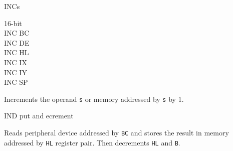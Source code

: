 \begin{basedescript}{
	\desclabelstyle{\multilinelabel}
	\desclabelwidth{3cm}}
\begin{DetailItem}{INC}{s}
\begin{DetailVariants}
			\textnormal{16-bit}\\
			INC BC\\
			INC DE\\
			INC HL\\
			INC IX\\
			INC IY\\
			INC SP
		\end{DetailVariants}

		Increments the operand {\tt s} or memory addressed by {\tt s} by 1.

		\begin{DetailEffects}[v]
			\FlagsINCr[8-bit]
		\end{DetailEffects}

		\begin{DetailEffectsFlags}
		\end{DetailEffectsFlags}

		\begin{DetailTiming}
		\end{DetailTiming}

	\end{DetailItem}

	\pagebreak
	\IntentionallyEmpty
	\pagebreak


	\begin{DetailItem}{IND}{}
		{put and ecrement}
		{\SymIND}

		Reads peripheral device addressed by {\tt BC} and stores the result in memory addressed by {\tt HL} register pair. Then decrements {\tt HL} and {\tt B}.


\end{DetailItem}
\end{basedescript}
